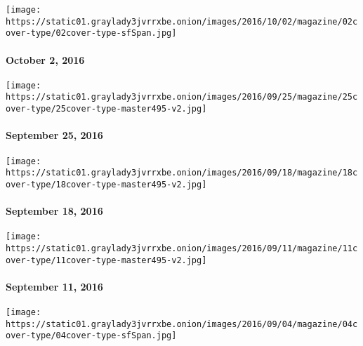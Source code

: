 \href{http://www.nytimes3xbfgragh.onion/indexes/2016/10/02/magazine/index.html}{}

\texttt{[image: https://static01.graylady3jvrrxbe.onion/images/2016/10/02/magazine/02cover-type/02cover-type-sfSpan.jpg]}

\hypertarget{october-2-2016}{%
\paragraph{October 2, 2016}\label{october-2-2016}}

\href{http://www.nytimes3xbfgragh.onion/indexes/2016/09/25/magazine/index.html}{}

\texttt{[image: https://static01.graylady3jvrrxbe.onion/images/2016/09/25/magazine/25cover-type/25cover-type-master495-v2.jpg]}

\hypertarget{september-25-2016}{%
\paragraph{September 25, 2016}\label{september-25-2016}}

\href{http://www.nytimes3xbfgragh.onion/indexes/2016/09/18/magazine/index.html}{}

\texttt{[image: https://static01.graylady3jvrrxbe.onion/images/2016/09/18/magazine/18cover-type/18cover-type-master495-v2.jpg]}

\hypertarget{september-18-2016}{%
\paragraph{September 18, 2016}\label{september-18-2016}}

\href{http://www.nytimes3xbfgragh.onion/indexes/2016/09/11/magazine/index.html}{}

\texttt{[image: https://static01.graylady3jvrrxbe.onion/images/2016/09/11/magazine/11cover-type/11cover-type-master495-v2.jpg]}

\hypertarget{september-11-2016}{%
\paragraph{September 11, 2016}\label{september-11-2016}}

\href{http://www.nytimes3xbfgragh.onion/indexes/2016/09/04/magazine/index.html}{}

\texttt{[image: https://static01.graylady3jvrrxbe.onion/images/2016/09/04/magazine/04cover-type/04cover-type-sfSpan.jpg]}

